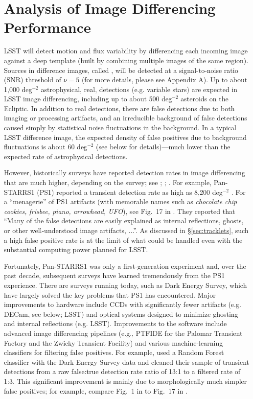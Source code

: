 \section{Analysis of Image Differencing Performance \label{sec:imDiff}}

LSST will detect motion and flux variability by differencing each incoming image
against a deep template (built by combining multiple images of the same region).
Sources in difference images, called \DIASources, will be detected at a signal-to-noise
ratio (SNR) threshold of $\nu=5$ (for more details, please see Appendix A). Up to about 1,000 deg$^{-2}$
astrophysical, real, detections (e.g. variable stars) are expected in LSST image differencing, including
up to about 500 deg$^{-2}$ asteroids on the Ecliptic. In addition to real detections,
there are false detections due to both imaging or processing artifacts, and an
irreducible background of false detections caused simply by statistical noise
fluctuations in the background. In a typical LSST difference image, the expected
density of false positives due to background fluctuations is about 60 deg$^{-2}$
(see below for details)---much lower than the expected rate of astrophysical
detections.

However, historically surveys have reported detection rates in image differencing that are much
higher, depending on the survey; see \cite{denneau13}; \cite{kessler15}; \cite{goldstein15}.
For example, Pan-STARRS1 (PS1) reported a transient detection rate as high as 8,200 deg$^{-2}$
\citep{denneau13}. For a ``menagerie'' of PS1 artifacts (with memorable names such as
{\it chocolate chip cookies, frisbee, piano, arrowhead, UFO}), see Fig.~17 in \cite{denneau13}.
They reported that ``Many of the false detections are easily explained as internal reflections,
ghosts, or other well-understood image artifacts, ...''. As discussed in \S\ref{sec:tracklets},
such a high false positive rate is at the limit of what could be handled even
with the substantial computing power planned for LSST.

Fortunately, Pan-STARRS1 was only a first-generation experiment and, over the past decade,
subsequent surveys have learned tremendously from the PS1 experience. There are surveys
running today, such as Dark Energy Survey, which have largely solved the key problems that
PS1 has encountered. Major improvements to hardware include CCDs with significantly fewer
artifacts (e.g. DECam, see below; LSST) and optical systems designed to minimize ghosting
and internal reflections (e.g. LSST). Improvements to the software include advanced image
differencing pipelines (e.g., PTFIDE for the Palomar Transient Factory and the Zwicky Transient
Facility) and various machine-learning classifiers for filtering false positives. For example,
\cite{goldstein15} used a Random Forest classifier with the Dark Energy Survey data
and cleaned their sample of transient detections from a raw false:true detection
rate ratio of 13:1 to a filtered rate of 1:3. This significant improvement is
mainly due to morphologically much simpler false positives; for example, compare
Fig.~1 in \cite{goldstein15} to Fig.~17 in \cite{denneau13}.

